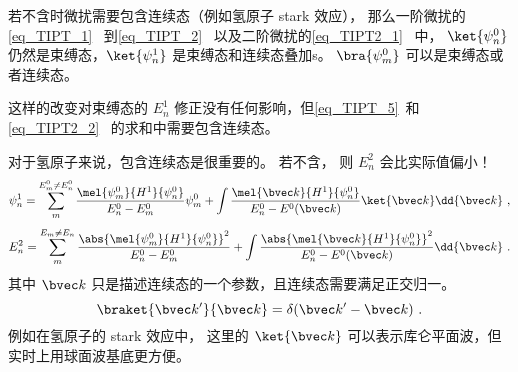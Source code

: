 
\begin{issues}
\issueDraft
\end{issues}


若不含时微扰需要包含连续态（例如氢原子 stark 效应）， 那么一阶微扰的\autoref{eq_TIPT_1}~ 到\autoref{eq_TIPT_2}~ 以及二阶微扰的\autoref{eq_TIPT2_1}~ 中， $\ket{\psi_n^0}$ 仍然是束缚态，$\ket{\psi_n^1}$ 是束缚态和连续态叠加s。 $\bra{\psi_m^0}$ 可以是束缚态或者连续态。

这样的改变对束缚态的 $E_n^1$ 修正没有任何影响，但\autoref{eq_TIPT_5}~和\autoref{eq_TIPT2_2}~ 的求和中需要包含连续态。

对于氢原子来说，包含连续态是很重要的。 若不含， 则 $E_n^2$ 会比实际值偏小！
\begin{equation}
\psi_n^1 = \sum_m^{E_m^0 \ne E_n^0} \frac{\mel{\psi_m^0}{H^1}{\psi_n^0}}{E_n^0 - E_m^0} \psi_m^0
+ \int \frac{\mel{\bvec k}{H^1}{\psi_n^0}}{E_n^0 - E^0(\bvec k)} \ket{\bvec k}\dd{\bvec k}~,
\end{equation}
%
\begin{equation}\label{eq_TIPTc_1}
E_n^2 = \sum_{m}^{E_m\ne E_n} \frac{\abs{\mel{\psi_m^0}{H^1}{\psi_n^0}}^2}{E_n^0-E_m^0}
+ \int \frac{\abs{\mel{\bvec k}{H^1}{\psi_n^0}}^2}{E_n^0-E^0(\bvec k)}\dd{\bvec k}~.
\end{equation}
其中 $\bvec k$ 只是描述连续态的一个参数，且连续态需要满足正交归一。
\begin{equation}
\braket{\bvec k'}{\bvec k} = \delta(\bvec k'-\bvec k)~.
\end{equation}
例如在氢原子的 stark 效应中， 这里的 $\ket{\bvec k}$ 可以表示库仑平面波，但实时上用球面波基底更方便。

